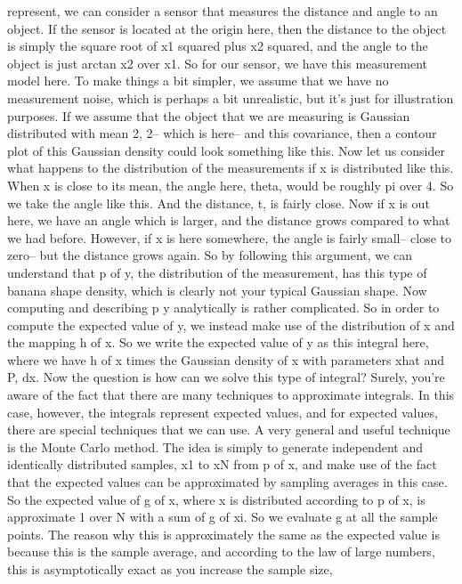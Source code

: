 represent, we can consider a sensor
that measures the distance and angle to an object.
If the sensor is located at the origin here,
then the distance to the object is simply
the square root of x1 squared plus x2 squared,
and the angle to the object is just arctan x2 over x1.
So for our sensor, we have this measurement model here.
To make things a bit simpler, we assume
that we have no measurement noise, which is perhaps
a bit unrealistic, but it's just for illustration purposes.
If we assume that the object that we are measuring
is Gaussian distributed with mean 2, 2--
which is here-- and this covariance,
then a contour plot of this Gaussian density
could look something like this.
Now let us consider what happens to the distribution
of the measurements if x is distributed like this.
When x is close to its mean, the angle here, theta,
would be roughly pi over 4.
So we take the angle like this.
And the distance, t, is fairly close.
Now if x is out here, we have an angle which is larger,
and the distance grows compared to what we had before.
However, if x is here somewhere, the angle is fairly small--
close to zero-- but the distance grows again.
So by following this argument, we can understand that p of y,
the distribution of the measurement,
has this type of banana shape density, which is clearly not
your typical Gaussian shape.
Now computing and describing p y analytically
is rather complicated.
So in order to compute the expected value of y,
we instead make use of the distribution
of x and the mapping h of x.
So we write the expected value of y as this integral
here, where we have h of x times the Gaussian density of x
with parameters xhat and P, dx.
Now the question is how can we solve this type of integral?
Surely, you're aware of the fact that there are many techniques
to approximate integrals.
In this case, however, the integrals
represent expected values, and for expected values,
there are special techniques that we can use.
A very general and useful technique
is the Monte Carlo method.
The idea is simply to generate independent and identically
distributed samples, x1 to xN from p of x,
and make use of the fact that the expected values
can be approximated by sampling averages in this case.
So the expected value of g of x, where
x is distributed according to p of x,
is approximate 1 over N with a sum of g of xi.
So we evaluate g at all the sample points.
The reason why this is approximately the same
as the expected value is because this is the sample average,
and according to the law of large numbers,
this is asymptotically exact as you increase the sample size,
